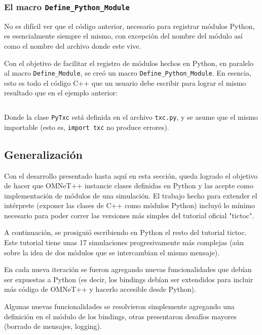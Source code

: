 \documentclass[]{article}
\begin{document}
\inputminted{c++}{codelistings/omnetpy.cc}

\subsubsection{El macro \texttt{Define\_Python\_Module}}

No es difícil ver que el código anterior, necesario para registrar módulos
Python, es esencialmente siempre el mismo, con excepción del nombre del módulo
así como el nombre del archivo donde este vive.

Con el objetivo de facilitar el registro de módulos hechos en Python, en
paralelo al macro \verb!Define_Module!, se creó un macro
\verb!Define_Python_Module!. En esencia, esto es todo el código C++ que un
usuario debe escribir para lograr el mismo resultado que en el ejemplo
anterior:

\inputminted{c++}{codelistings/pytxc.cc}

Donde la clase \verb!PyTxc! está definida en el archivo \verb!txc.py!, y se
asume que el mismo importable (esto es, \verb!import txc! no produce errores).

\subsection{Generalización}

Con el desarrollo presentado hasta aquí en esta sección, queda logrado el
objetivo de hacer que OMNeT++ instancie clases definidas en Python y las acepte
como implementación de módulos de una simulación. El trabajo hecho para
extender el intérprete (exponer las clases de C++ como módulos Python) incluyó
lo mínimo necesario para poder correr las versiones más simples del tutorial
oficial "tictoc". 

A continuación, se prosiguió escribiendo en Python el resto del tutorial
tictoc. Este tutorial tiene unas 17 simulaciones progresivamente más complejas
(aún sobre la idea de dos módulos que se intercambian el mismo mensaje).

En cada nueva iteración se fueron agregando nuevas funcionalidades que debían
ser expuestas a Python (es decir, los bindings debían ser extendidos para
incluir más código de OMNeT++ y hacerlo accesible desde Python).

Algunas nuevas funcionalidades se resolvieron simplemente agregando una
definición en el módulo de los bindings, otras presentaron desafíos mayores
(borrado de mensajes, logging).
\end{document}
